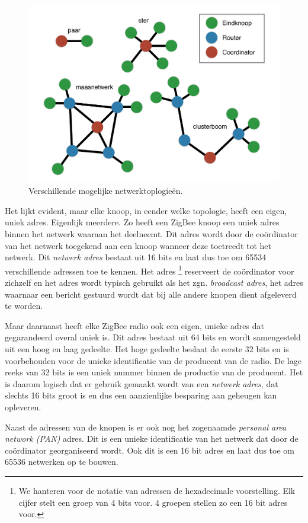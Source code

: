 \begin{figure}[ht]
  \centering
  \includegraphics[width=0.7\linewidth]{resources/topology.pdf}
  \caption{Verschillende mogelijke netwerktoplogie\"en.}
  \label{fig:topologie}
\end{figure}

Het lijkt evident, maar elke knoop, in eender welke topologie, heeft een eigen,
uniek adres. Eigenlijk meerdere. Zo heeft een ZigBee knoop een uniek adres
binnen het netwerk waaraan het deelneemt. Dit adres wordt door de co\"ordinator
van het netwerk toegekend aan een knoop wanneer deze toetreedt tot het netwerk.
Dit \emph{netwerk adres} bestaat uit 16 bits en laat dus toe om 65534
verschillende adressen toe te kennen. Het adres \footnote{We
hanteren voor de notatie van adressen de hexadecimale voorstelling. Elk cijfer
stelt een groep van 4 bits voor. 4 groepen stellen zo een 16 bit adres voor.}
reserveert de co\"ordinator voor zichzelf en het adres  wordt
typisch gebruikt als het zgn. \emph{broadcast adres}, het adres waarnaar een
bericht gestuurd wordt dat bij alle andere knopen dient afgeleverd te worden.

Maar daarnaast heeft elke ZigBee radio ook een eigen, unieke adres dat
gegarandeerd overal uniek is. Dit adres bestaat uit 64 bits en wordt
samengesteld uit een hoog en laag gedeelte. Het hoge gedeelte beslaat de eerste
32 bits en is voorbehouden voor de unieke identificatie van de producent van de
radio. De lage reeks van 32 bits is een uniek nummer binnen de productie van de
producent. Het is daarom logisch dat er gebruik gemaakt wordt van een
\emph{netwerk adres}, dat slechts 16 bits groot is en dus een aanzienlijke
besparing aan geheugen kan opleveren.

Naast de adressen van de knopen is er ook nog het zogenaamde \emph{personal
area network (PAN)} adres. Dit is een unieke identificatie van het netwerk dat
door de co\"ordinator georganiseerd wordt. Ook dit is een 16 bit adres en laat
dus toe om 65536 netwerken op te bouwen.

